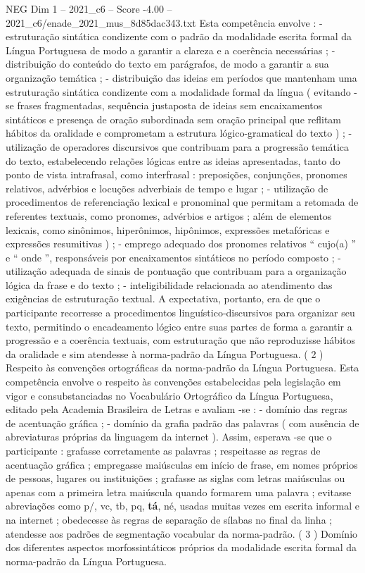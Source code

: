 \begin{textsample}{NEG Dim 1 – 2021\_c6 – Score -4.00 – 2021\_c6/enade\_2021\_mus\_8d85dac343.txt}
Esta competência envolve : - estruturação sintática condizente com o padrão da modalidade escrita formal da Língua Portuguesa de modo a garantir a clareza e a coerência necessárias ; - distribuição do conteúdo do texto em parágrafos, de modo a garantir a sua organização temática ; - distribuição das ideias em períodos que mantenham uma estruturação sintática condizente com a modalidade formal da língua ( evitando -se frases fragmentadas, sequência justaposta de ideias sem encaixamentos sintáticos e presença de oração subordinada sem oração principal que reflitam hábitos da oralidade e comprometam a estrutura lógico-gramatical do texto ) ; - utilização de operadores discursivos que contribuam para a progressão temática do texto, estabelecendo relações lógicas entre as ideias apresentadas, tanto do ponto de vista intrafrasal, como interfrasal : preposições, conjunções, pronomes relativos, advérbios e locuções adverbiais de tempo e lugar ; - utilização de procedimentos de referenciação lexical e pronominal que permitam a retomada de referentes textuais, como pronomes, advérbios e artigos ; além de elementos lexicais, como sinônimos, hiperônimos, hipônimos, expressões metafóricas e expressões resumitivas ) ; - emprego adequado dos pronomes relativos “ cujo(a) ” e “ onde ”, responsáveis por encaixamentos sintáticos no período composto ; - utilização adequada de sinais de pontuação que contribuam para a organização lógica da frase e do texto ; - inteligibilidade relacionada ao atendimento das exigências de estruturação textual.
A expectativa, portanto, era de que o participante recorresse a procedimentos linguístico-discursivos para organizar seu texto, permitindo o encadeamento lógico entre suas partes de forma a garantir a progressão e a coerência textuais, com estruturação que não reproduzisse hábitos da oralidade e sim atendesse à norma-padrão da Língua Portuguesa. ( 2 ) Respeito às convenções ortográficas da norma-padrão da Língua Portuguesa.
Esta competência envolve o respeito às convenções estabelecidas pela legislação em vigor e consubstanciadas no Vocabulário Ortográfico da Língua Portuguesa, editado pela Academia Brasileira de Letras e avaliam -se : - domínio das regras de acentuação gráfica ; - domínio da grafia padrão das palavras ( com ausência de abreviaturas próprias da linguagem da internet ).
Assim, esperava -se que o participante : grafasse corretamente as palavras ; respeitasse as regras de acentuação gráfica ; empregasse maiúsculas em início de frase, em nomes próprios de pessoas, lugares ou instituições ; grafasse as siglas com letras maiúsculas ou apenas com a primeira letra maiúscula quando formarem uma palavra ; evitasse abreviações como p/, vc, tb, pq, \textbf{tá}, né, usadas muitas vezes em escrita informal e na internet ; obedecesse às regras de separação de sílabas no final da linha ; atendesse aos padrões de segmentação vocabular da norma-padrão. ( 3 ) Domínio dos diferentes aspectos morfossintáticos próprios da modalidade escrita formal da norma-padrão da Língua Portuguesa.

\end{textsample}
